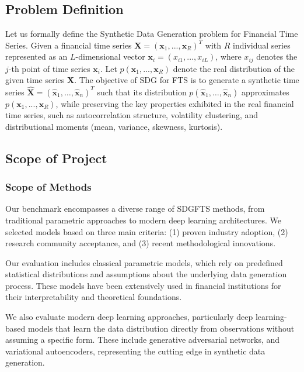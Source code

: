 \documentclass[sigconf]{acmart}
\begin{document}
  \subsection{Problem Definition}
    Let us formally define the Synthetic Data Generation problem 
    for Financial Time Series. Given a financial time series 
    $\textbf{X} = (\textbf{x}_1,...,\textbf{x}_R)^T$ with $R$ 
    individual series represented as an $L$-dimensional vector 
    $\textbf{x}_i=(x_{i1},...,x_{iL})$, where $x_{ij}$ denotes 
    the $j$-th point of time series $\textbf{x}_i$. Let 
    $p(\textbf{x}_1,...,\textbf{x}_R)$ denote the real distribution 
    of the given time series $\textbf{X}$. The objective of SDG 
    for FTS is to generate a synthetic time series 
    $\mathbf{\hat{X}} = (\mathbf{\hat{x}}_1, \ldots, 
    \mathbf{\hat{x}}_n)^{T}$ such that its distribution 
    $p(\mathbf{\hat{x}}_1, \ldots, \mathbf{\hat{x}}_n)$ 
    approximates $p(\textbf{x}_1,...,\textbf{x}_R)$, while 
    preserving the key properties exhibited in the real financial 
    time series, such as autocorrelation structure, volatility 
    clustering, and distributional moments (mean, variance, 
    skewness, kurtosis).

  \subsection{Scope of Project}
    \subsubsection{Scope of Methods}
      Our benchmark encompasses a diverse range of SDGFTS methods, 
      from traditional parametric approaches to modern deep 
      learning architectures. We selected models based on three 
      main criteria: (1) proven industry adoption, (2) research 
      community acceptance, and (3) recent methodological 
      innovations.

      Our evaluation includes classical parametric models, which 
      rely on predefined statistical distributions and assumptions 
      about the underlying data generation process. These models 
      have been extensively used in financial institutions for 
      their interpretability and theoretical foundations. 

      We also evaluate modern deep learning approaches, 
      particularly deep learning-based models that learn the data 
      distribution directly from observations without assuming a 
      specific form. These include generative adversarial 
      networks, and variational autoencoders, 
      representing the cutting edge in synthetic data generation.
\end{document}
